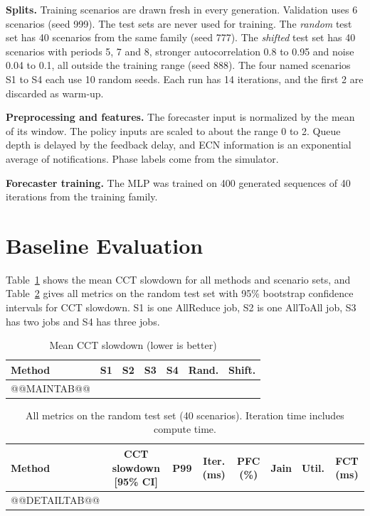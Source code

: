 \documentclass[conference]{IEEEtran}
\begin{document}
\textbf{Splits.} Training scenarios are drawn fresh in every generation. Validation uses 6 scenarios (seed 999). The test sets are never used for training. The \emph{random} test set has 40 scenarios from the same family (seed 777). The \emph{shifted} test set has 40 scenarios with periods 5, 7 and 8, stronger autocorrelation 0.8 to 0.95 and noise 0.04 to 0.1, all outside the training range (seed 888). The four named scenarios S1 to S4 each use 10 random seeds. Each run has 14 iterations, and the first 2 are discarded as warm-up.

\textbf{Preprocessing and features.} The forecaster input is normalized by the mean of its window. The policy inputs are scaled to about the range 0 to 2. Queue depth is delayed by the feedback delay, and ECN information is an exponential average of notifications. Phase labels come from the simulator.

\textbf{Forecaster training.} The MLP was trained on 400 generated sequences of 40 iterations from the training family.

\section{Baseline Evaluation}
Table~\ref{tab:main} shows the mean CCT slowdown for all methods and scenario sets, and Table~\ref{tab:detail} gives all metrics on the random test set with 95\% bootstrap confidence intervals for CCT slowdown. S1 is one AllReduce job, S2 is one AllToAll job, S3 has two jobs and S4 has three jobs.

\begin{table}[t]
\centering
\caption{Mean CCT slowdown (lower is better)}
\label{tab:main}
\scriptsize
\begin{tabular}{lcccccc}
\toprule
\textbf{Method} & \textbf{S1} & \textbf{S2} & \textbf{S3} & \textbf{S4} & \textbf{Rand.} & \textbf{Shift.} \\
\midrule
@@MAINTAB@@
\bottomrule
\end{tabular}
\end{table}

\begin{table}[t]
\centering
\caption{All metrics on the random test set (40 scenarios). Iteration time includes compute time.}
\label{tab:detail}
\small
\begin{tabular}{lccccccc}
\toprule
\textbf{Method} & \textbf{CCT slowdown [95\% CI]} & \textbf{P99} & \textbf{Iter. (ms)} & \textbf{PFC (\%)} & \textbf{Jain} & \textbf{Util.} & \textbf{FCT (ms)} \\
\midrule
@@DETAILTAB@@
\bottomrule
\end{tabular}
\end{table}
\end{document}
